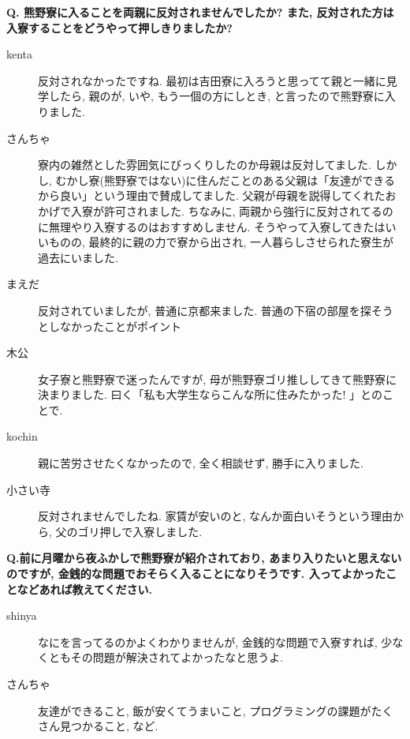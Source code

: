 \documentclass[10pt,b5jsbook,dvips,dvipdfmx,openany]{jsbook}
\theoremstyle{definition}
\begin{document}
		\begin{multicols}{2}
		\begin{tcolorbox}
		\textbf{Q. 熊野寮に入ることを両親に反対されませんでしたか? また, 反対された方は入寮することをどうやって押しきりましたか?}
		\end{tcolorbox}
		\begin{description}
		\item[kenta]反対されなかったですね. 最初は吉田寮に入ろうと思ってて親と一緒に見学したら, 親のが, いや, もう一個の方にしとき, と言ったので熊野寮に入りました. 

		\item[さんちゃ]
		寮内の雑然とした雰囲気にびっくりしたのか母親は反対してました. しかし, むかし寮(熊野寮ではない)に住んだことのある父親は「友達ができるから良い」という理由で賛成してました. 父親が母親を説得してくれたおかげで入寮が許可されました. ちなみに, 両親から強行に反対されてるのに無理やり入寮するのはおすすめしません. そうやって入寮してきたはいいものの, 最終的に親の力で寮から出され, 一人暮らしさせられた寮生が過去にいました. 

		\item[まえだ]
		反対されていましたが, 普通に京都来ました. 普通の下宿の部屋を探そうとしなかったことがポイント

		\item[木公]
		女子寮と熊野寮で迷ったんですが, 母が熊野寮ゴリ推ししてきて熊野寮に決まりました. 曰く「私も大学生ならこんな所に住みたかった! 」とのことで. 

		\item[kochin]
		親に苦労させたくなかったので, 全く相談せず, 勝手に入りました. 

		\item[小さい寺]
		反対されませんでしたね. 家賃が安いのと, なんか面白いそうという理由から, 父のゴリ押しで入寮しました. 
		\end{description}

		\begin{tcolorbox}
		\textbf{Q.前に月曜から夜ふかしで熊野寮が紹介されており, あまり入りたいと思えないのですが, 金銭的な問題でおそらく入ることになりそうです. 入ってよかったことなどあれば教えてください. }
		\end{tcolorbox}

		\begin{description}
		\item[shinya]
		なにを言ってるのかよくわかりませんが, 金銭的な問題で入寮すれば, 少なくともその問題が解決されてよかったなと思うよ. 

		\item[さんちゃ]
		友達ができること, 飯が安くてうまいこと, プログラミングの課題がたくさん見つかること, など. 


\end{description}
\end{multicols}
\end{document}
